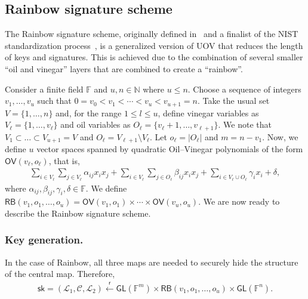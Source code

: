\documentclass[12pt, a4paper, oneside]{memoir}
\newcommand{\random}{\overset{\mathsf{r}}{\gets}}
\theoremstyle{definition}
\begin{document}
\subsection{Rainbow signature scheme}\label{subsec:rainbow}

The Rainbow signature scheme, originally defined in~\cite{Ding:200506} and a finalist of the NIST standardization process~\cite[Sec.~3.20]{Alagic:202007}, is a generalized version of UOV that reduces the length of keys and signatures. This is achieved due to the combination of several smaller ``oil and vinegar'' layers that are combined to create a ``rainbow''.

Consider a finite field $\mathbb{F}$ and $u, n \in \mathbb{N}$ where $u \leq n$. Choose a sequence of integers $v_{1}, \dots, v_{u}$ such that $0 = v_{0} < v_{1} < \cdots < v_{u} < v_{u + 1} = n$. Take the usual set $V = \{1, \dots, n\}$ and, for the range $1 \leq l \leq u$, define vinegar variables as $V_{\ell} = \{1, \dots, v_{\ell}\}$ and oil variables as $O_{\ell} = \{v_{\ell} + 1, \dots, v_{\ell + 1}\}$. We note that $V_{1} \subset \dots \subset V_{u + 1} = V$ and $O_{\ell} = V_{\ell + 1} \setminus V_{\ell}$. Let $o_{\ell} = |O_{\ell}|$ and $m = n - v_{1}$. Now, we define $u$ vector spaces spanned by quadratic Oil--Vinegar polynomials of the form $\mathsf{OV}(v_{\ell}, o_{\ell})$, that is,
\begin{align}\label{eq:oil-vinegar-space}
  \sum_{i \in V_{\ell}} \sum_{j \in V_{\ell}} \alpha_{ij} x_{i} x_{j}
    + \sum_{i \in V_{\ell}} \sum_{j \in O_{\ell}} \beta_{ij} x_{i} x_{j}
    + \sum_{i \in V_{\ell} \cup O_{\ell}} \gamma_{i} x_{i} + \delta,
\end{align}
where $\alpha_{ij}, \beta_{ij}, \gamma_{i}, \delta \in \mathbb{F}$. We define $\mathsf{RB}(v_{1}, o_{1}, \dots, o_{u}) = \mathsf{OV}(v_{1}, o_{1}) \times \cdots \times \mathsf{OV}(v_{u}, o_{u})$. We are now ready to describe the Rainbow signature scheme.

\subsubsection{Key generation.}

In the case of Rainbow, all three maps are needed to securely hide the structure of the central map. Therefore,
\begin{align}\label{eq:sk-rainbow}
  \mathsf{sk} = (\mathcal{L}_{1}, \mathcal{C}, \mathcal{L}_{2}) 
    \random \mathsf{GL}(\mathbb{F}^{m}) \times \mathsf{RB}(v_{1}, o_{1}, \dots, o_{u}) \times \mathsf{GL}(\mathbb{F}^{n}).
\end{align}
\end{document}
